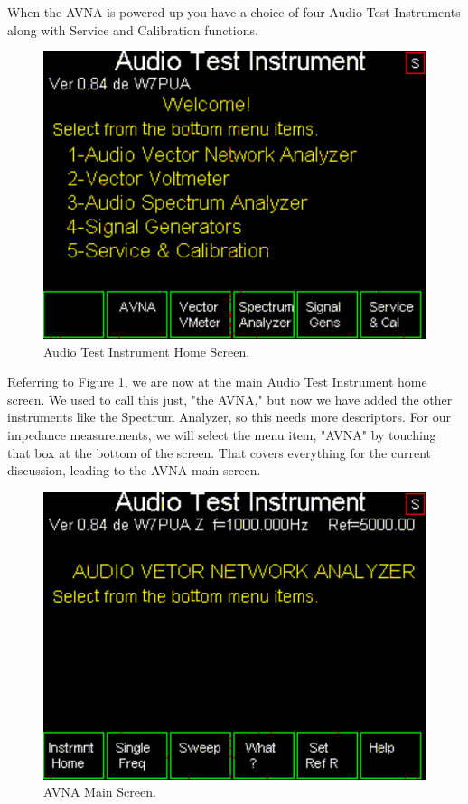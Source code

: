 When the AVNA is powered up you have a choice of four Audio Test Instruments along with Service and Calibration functions.
\begin{figure}[H]
\begin{center}
\includegraphics[scale=0.75]{./images/AVNA_000.pdf}
\caption{Audio Test Instrument Home  Screen.}
\label{AVNA_000-label}
\end{center}
\end{figure}
%
Referring to Figure \ref{AVNA_000-label}, we are now at the main Audio Test Instrument home screen.
We used to call this just, "the AVNA," but now we have added the other instruments like the Spectrum Analyzer, so this needs more descriptors.
For our impedance measurements, we will select the menu item, "AVNA" by touching that box at the bottom of the screen.
That  covers everything for the current discussion, leading to the AVNA main screen.
\begin{figure}[H]
\begin{center}
\includegraphics[scale=0.75]{./images/AVNA_001.pdf}
\caption{AVNA Main  Screen.}
\label{AVNA_001-label}
\end{center}
\end{figure}
